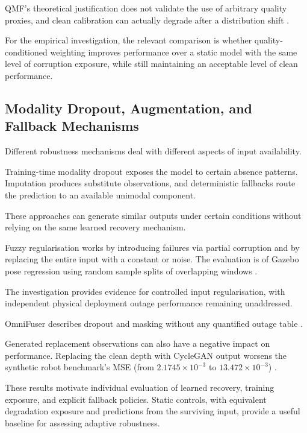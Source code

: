 QMF's theoretical justification does not validate the use of arbitrary quality proxies, and clean
calibration can actually degrade after a distribution shift \citep{Zhang2023QMF,P008}.

For the empirical investigation, the relevant comparison is whether quality-conditioned weighting
improves performance over a static model with the same level of corruption exposure, while still
maintaining an acceptable level of clean performance.

\subsection{Modality Dropout, Augmentation, and Fallback Mechanisms}

Different robustness mechanisms deal with different aspects of input availability.

Training-time modality dropout exposes the model to certain absence patterns. Imputation produces
substitute observations, and deterministic fallbacks route the prediction to an available unimodal
component.

These approaches can generate similar outputs under certain conditions without relying on the same
learned recovery mechanism.

Fuzzy regularisation works by introducing failures via partial corruption and by replacing the
entire input with a constant or noise. The evaluation is of Gazebo pose regression using random
sample splits of overlapping windows \citep[PDF pp.~3--5]{Altinses2023Fuzzy}.

The investigation provides evidence for controlled input regularisation, with independent physical
deployment outage performance remaining unaddressed.

OmniFuser describes dropout and masking without any quantified outage table \citep[PDF p.~10]{P021}.

Generated replacement observations can also have a negative impact on performance. Replacing the
clean depth with CycleGAN output worsens the synthetic robot benchmark's MSE (from $2.1745 \times
10^{-3}$ to $13.472 \times 10^{-3}$) \citep[Table~7]{Altinses2025Performance}.

These results motivate individual evaluation of learned recovery, training exposure, and explicit
fallback policies. Static controls, with equivalent degradation exposure and predictions from the
surviving input, provide a useful baseline for assessing adaptive robustness.

